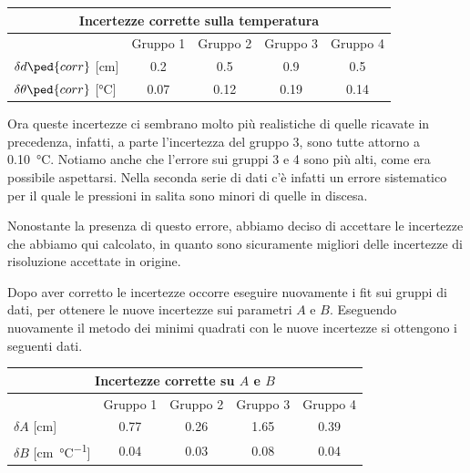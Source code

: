 \begin{center}
    \begin{tabular}{l c c c c}
        \multicolumn{5}{c}{\textbf{Incertezze corrette sulla temperatura}} \\
        \toprule
        & Gruppo 1 & Gruppo 2 & Gruppo 3 & Gruppo 4 \\
        \midrule
        $\delta d\ped{corr}$ [cm] & 0.2 & 0.5 & 0.9 & 0.5 \\
        $\delta \theta\ped{corr}$ [\si{\celsius}] & 0.07 & 0.12 & 0.19 & 0.14 \\
        \bottomrule
    \end{tabular}
\end{center}

Ora queste incertezze ci sembrano molto più realistiche di quelle ricavate in precedenza, infatti, a parte l'incertezza del 
gruppo 3, sono tutte attorno a \SI{0.10}{\celsius}. Notiamo anche che l'errore sui gruppi 3 e 4 sono più alti, come era possibile aspettarsi.
Nella seconda serie di dati c'è infatti un errore sistematico per il quale le pressioni in salita sono minori di quelle in discesa.

Nonostante la presenza di questo errore, abbiamo deciso di accettare le incertezze che abbiamo qui calcolato, in quanto
sono sicuramente migliori delle incertezze di risoluzione accettate in origine.

Dopo aver corretto le incertezze occorre eseguire nuovamente i fit sui gruppi di dati, per ottenere le nuove incertezze sui parametri
$A$ e $B$. Eseguendo nuovamente il metodo dei minimi quadrati con le nuove incertezze si ottengono i seguenti dati.

\begin{center}
    \begin{tabular}{l c c c c}
        \multicolumn{5}{c}{\textbf{Incertezze corrette su $A$ e $B$}} \\
        \toprule
        & Gruppo 1 & Gruppo 2 & Gruppo 3 & Gruppo 4 \\
        \midrule
        $\delta A$ [cm] & 0.77 & 0.26 & 1.65 & 0.39 \\
        $\delta B$ [\si{\centi\metre\per\celsius}] & 0.04 & 0.03 & 0.08 & 0.04 \\
        \bottomrule
    \end{tabular}
\end{center}

